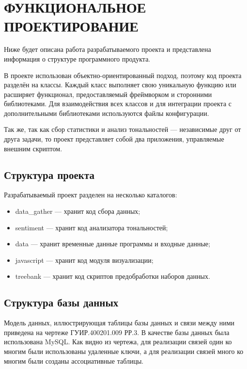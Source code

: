\section{ФУНКЦИОНАЛЬНОЕ ПРОЕКТИРОВАНИЕ}
\label{sec:functional}
Ниже будет описана работа разрабатываемого проекта и представлена информация о структуре программного продукта.

В проекте использован объектно-ориентированный подход, поэтому код проекта разделён на классы. Каждый класс выполняет свою уникальную функцию или расширяет функционал, предоставляемый фреймворком и сторонними библиотеками. Для взаимодействия всех классов и для интеграции проекта с дополнительными библиотеками используются файлы конфигурации.

Так же, так как сбор статистики и анализ тональностей --- независимые друг от друга задачи, то проект представляет собой два приложения, управляемые внешним скриптом.
\subsection{Структура проекта}
Разрабатываемый проект разделен на несколько каталогов:
\begin{itemize}
\item data\_gather --- хранит код сбора данных;
\item sentiment --- хранит код анализатора тональностей;
\item data --- хранит временные данные программы и входные данные;
\item javascript --- хранит код модуля визуализации;
\item treebank --- хранит код скриптов предобработки наборов данных.
\end{itemize}
\subsection{Структура базы данных}
Модель данных, иллюстрирующая таблицы базы данных и связи между ними приведена на чертеже ГУИР.400201.009 РР.3. В качестве базы данных была использована MySQL\@. Как видно из чертежа, для реализации связей один ко многим были использованы удаленные ключи, а для реализации связей много ко многим были созданы ассоциативные таблицы.
